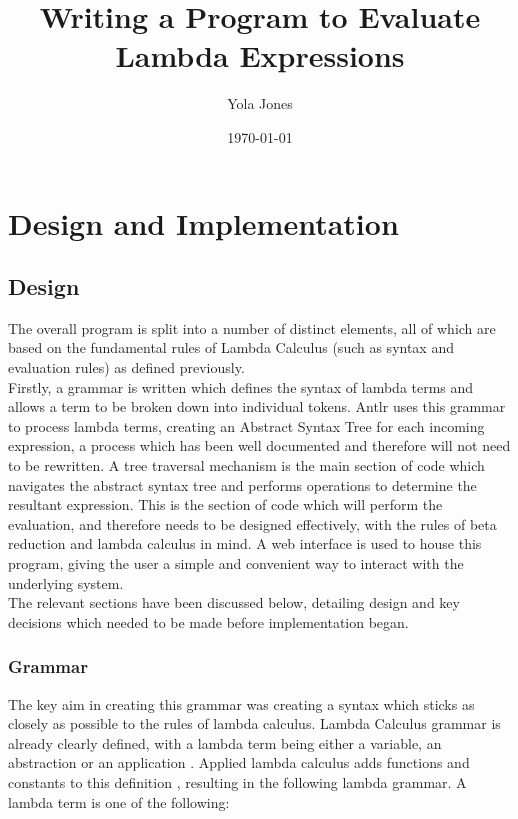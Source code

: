\documentclass[a4paper,12pt]{report}
\begin{document}
\title{Writing a Program to Evaluate Lambda Expressions}
\author{Yola Jones}
\date{\today}
\maketitle

%
%

\chapter{Design and Implementation}
\section{Design}

The overall program is split into a number of distinct elements, all of which are based on the fundamental rules of Lambda Calculus (such as syntax and evaluation rules) as defined previously.\\

Firstly, a grammar is written which defines the syntax of lambda terms and allows a term to be broken down into individual tokens. Antlr uses this grammar to process lambda terms, creating an Abstract Syntax Tree for each incoming expression\cite{Parr2012}, a process which has been well documented and therefore will not need to be rewritten. A tree traversal mechanism is the main section of code which navigates the abstract syntax tree and performs operations to determine the resultant expression. This is the section of code which will perform the evaluation, and therefore needs to be designed effectively, with the rules of beta reduction and lambda calculus in mind. A web interface is used to house this program, giving the user a simple and convenient way to interact with the underlying system.\\

The relevant sections have been discussed below, detailing design and key decisions which needed to be made before implementation began. %

\subsection{Grammar}

The key aim in creating this grammar was creating a syntax which sticks as closely as possible to the rules of lambda calculus. Lambda Calculus grammar is already clearly defined, with a lambda term being either a variable, an abstraction or an application \cite{Hankin2004}. Applied lambda calculus adds functions and constants to this definition \cite{Slonneger1995}, resulting in the following lambda grammar. A lambda term is one of the following:
\end{document}
